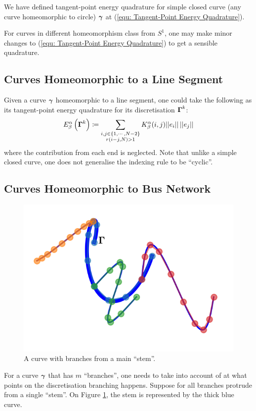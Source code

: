 \documentclass[../dissertation.tex]{subfiles}
\begin{document}
We have defined tangent-point energy quadrature for simple closed curve (any curve homeomorphic to circle) $\boldsymbol{\gamma}$ at (\ref{equ: Tangent-Point Energy Quadrature}).

For curves in different homeomorphism class from $S^1$,
one may make minor changes to (\ref{equ: Tangent-Point Energy Quadrature}) to get a sensible quadrature.

\subsection{Curves Homeomorphic to a Line Segment}
Given a curve $\boldsymbol{\gamma}$ homeomorphic to a line segment,
one could take the following as its tangent-point energy quadrature for its discretisation $\boldsymbol{\Gamma}^k$:
\begin{equation}
    E_{\beta}^{\alpha} \left( \boldsymbol{\Gamma}^k \right) \coloneqq \sum_{\substack{i,j \in \left\{ 1, \cdots, N-2 \right\} \\ r\left( i-j,N \right) > 1}} K_{\beta}^{\alpha} (i,j) \lvert \lvert e_i \rvert \rvert \, \lvert \lvert e_j \rvert \rvert
\end{equation}
where the contribution from each end is neglected.
Note that unlike a simple closed curve,
one does not generalise the indexing rule to be ``cyclic''.

\subsection{Curves Homeomorphic to Bus Network}
\begin{figure}[tpb]
    \centering
    \includegraphics[]{sections/otherHomeomorphismImgs/branch}
    \caption{A curve with branches from a main ``stem''.}
    \label{fig: Bus Network}
\end{figure}
For a curve $\boldsymbol{\gamma}$ that has $m$ ``branches'', one needs to take into account of at what points on the discretisation branching happens.
Suppose for all branches protrude from a single ``stem''.
On Figure \ref{fig: Bus Network}, the stem is represented by the thick blue curve.
\end{document}

